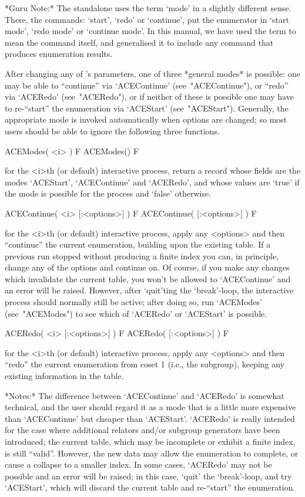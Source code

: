 *Guru Note:*
The {\ACE} standalone uses the term `mode'  in  a  slightly  different
sense. There, the commands: `start', `redo'  or  `continue',  put  the
{\ACE} enumerator in `start mode', `redo mode' or `continue mode'.  In
this manual, we have used the term to mean  the  command  itself,  and
generalised it  to  include  any  command  that  produces  enumeration
results.

After changing any of  {\ACE}'s  parameters,  one  of  three  *general
modes* is possible: one may be able to ``continue'' via  `ACEContinue'
(see~"ACEContinue"), or ``redo'' via `ACERedo' (see~"ACERedo"), or  if
neither of  these  is  possible  one  may  have  to  re-``start''  the
enumeration   via   `ACEStart'   (see~"ACEStart").   Generally,    the
appropriate mode is invoked automatically when options are changed; so
most users should be able to ignore the following three functions.

\>ACEModes( <i> ) F
\>ACEModes() F

for the <i>th (or default) interactive {\ACE} process, return a record
whose fields are the modes `ACEStart',  `ACEContinue'  and  `ACERedo',
and whose values are `true' if the mode is possible  for  the  process
and `false' otherwise.

\>ACEContinue( <i> [:<options>] ) F
\>ACEContinue( [:<options>] ) F

for the <i>th (or  default)  interactive  {\ACE}  process,  apply  any
<options> and then ``continue'' the current enumeration, building upon
the existing table. If a previous  run  stopped  without  producing  a
finite index you can, in principle, change  any  of  the  options  and
continue on. Of course, if you make any changes which  invalidate  the
current table, you won't be allowed to `ACEContinue' and an error will
be raised. However, after `quit'ting the `break'-loop, the interactive
{\ACE} process should normally still be active; after  doing  so,  run
`ACEModes' (see~"ACEModes") to see which of `ACERedo' or `ACEStart' is
possible.

\>ACERedo( <i> [:<options>] ) F
\>ACERedo( [:<options>] ) F

for the <i>th (or  default)  interactive  {\ACE}  process,  apply  any
<options> and then ``redo''  the  current  enumeration  from  coset  1
(i.e., the subgroup), keeping any existing information in the table.

*Notes:*
The  difference  between  `ACEContinue'  and  `ACERedo'  is   somewhat
technical, and the user should regard it as a mode that  is  a  little
more  expensive  than  `ACEContinue'  but  cheaper  than   `ACEStart'.
`ACERedo' is really intended for the case  where  additional  relators
and/or subgroup generators have been introduced;  the  current  table,
which may be incomplete or exhibit a finite index, is still ``valid''.
However, the new data may allow the enumeration to complete, or  cause
a collapse to a smaller index. In some cases,  `ACERedo'  may  not  be
possible and an error  will  be  raised;  in  this  case,  `quit'  the
`break'-loop, and try `ACEStart', which will discard the current table
and re-``start'' the enumeration.

